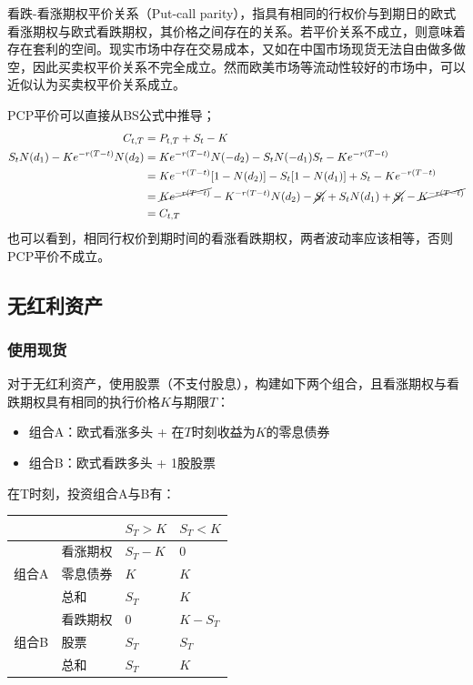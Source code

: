 \documentclass[11pt]{article}
\begin{document}
看跌-看涨期权平价关系（Put-call parity），指具有相同的行权价与到期日的欧式看涨期权与欧式看跌期权，其价格之间存在的关系。若平价关系不成立，则意味着存在套利的空间。现实市场中存在交易成本，又如在中国市场现货无法自由做多做空，因此买卖权平价关系不完全成立。然而欧美市场等流动性较好的市场中，可以近似认为买卖权平价关系成立。

PCP平价可以直接从BS公式中推导；
\begin{align*}
    C_{t,T} &= P_{t,T} + S_t -K \\
    S_t N(d_1) - K e^{-r(T-t)} N(d_2) &= K e^{-r(T-t)} N(-d_2) - S_t N(-d_1) S_t -Ke^{-r(T-t)} \\
    &= K e^{-r(T-t)} [1- N(d_2)] - S_t [1 - N(d_1) ] + S_t -Ke^{-r(T-t)} \\
    &= \cancel{K e^{-r(T-t)}} - K^{-r(T-t)} N(d_2) - \cancel{S_t} + S_t N(d_1) + \cancel{S_t} - \cancel{K^{-r(T-t)}} \\
    &= C_{t,T}
\end{align*}
也可以看到，相同行权价到期时间的看涨看跌期权，两者波动率应该相等，否则PCP平价不成立。

\subsection{无红利资产}

\subsubsection*{使用现货}

对于无红利资产，使用股票（不支付股息），构建如下两个组合，且看涨期权与看跌期权具有相同的执行价格$K$与期限$T$：
\begin{itemize}
    \item 组合A：欧式看涨多头 + 在$T$时刻收益为$K$的零息债券
    \item 组合B：欧式看跌多头 + 1股股票
\end{itemize}

在T时刻，投资组合A与B有：
\begin{table}[H]
\centering
\begin{tabular}{@{}clll@{}}
\toprule
                     &   & $S_T>K$ & $S_T<K$ \\ \midrule
\multirow{3}{*}{组合A} & 看涨期权 & $S_T-K$ & $0$ \\
                    & 零息债券 & $K$ & $K$ \\
                    & 总和   & $S_T$ & $K$ \\ \midrule
\multirow{3}{*}{组合B} & 看跌期权 & $0$ & $K-S_T$ \\
                     & 股票   & $S_T$ & $S_T$ \\
                     & 总和   & $S_T$ & $K$ \\ \bottomrule
\end{tabular}
\end{table}
\end{document}
